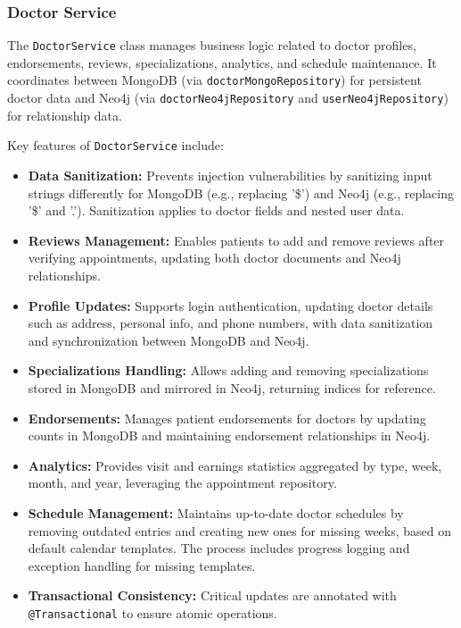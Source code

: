 \subsubsection{Doctor Service}

The \texttt{DoctorService} class manages business logic related to doctor profiles, endorsements, reviews, specializations, analytics, and schedule maintenance. It coordinates between MongoDB (via \texttt{doctorMongoRepository}) for persistent doctor data and Neo4j (via \texttt{doctorNeo4jRepository} and \texttt{userNeo4jRepository}) for relationship data.

Key features of \texttt{DoctorService} include:
\begin{itemize}
	\item \textbf{Data Sanitization:} Prevents injection vulnerabilities by sanitizing input strings differently for MongoDB (e.g., replacing '\$') and Neo4j (e.g., replacing '\$' and '.'). Sanitization applies to doctor fields and nested user data.
	
	\item \textbf{Reviews Management:} Enables patients to add and remove reviews after verifying appointments, updating both doctor documents and Neo4j relationships.
	
	\item \textbf{Profile Updates:} Supports login authentication, updating doctor details such as address, personal info, and phone numbers, with data sanitization and synchronization between MongoDB and Neo4j.
	
	\item \textbf{Specializations Handling:} Allows adding and removing specializations stored in MongoDB and mirrored in Neo4j, returning indices for reference.
	
	\item \textbf{Endorsements:} Manages patient endorsements for doctors by updating counts in MongoDB and maintaining endorsement relationships in Neo4j.
	
	\item \textbf{Analytics:} Provides visit and earnings statistics aggregated by type, week, month, and year, leveraging the appointment repository.
	
	\item \textbf{Schedule Management:} Maintains up-to-date doctor schedules by removing outdated entries and creating new ones for missing weeks, based on default calendar templates. The process includes progress logging and exception handling for missing templates.
	
	\item \textbf{Transactional Consistency:} Critical updates are annotated with \texttt{@Transactional} to ensure atomic operations.
\end{itemize}

